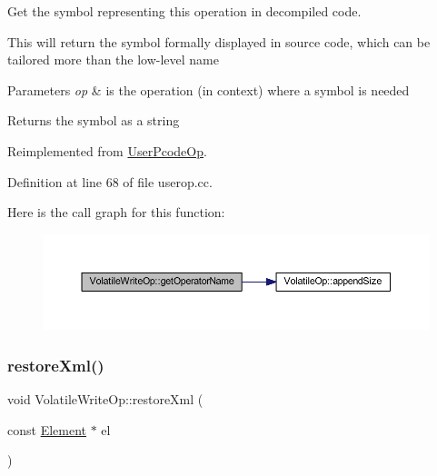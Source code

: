 Get the symbol representing this operation in decompiled code. 

This will return the symbol formally displayed in source code, which can be tailored more than the low-\/level name 
\begin{DoxyParams}{Parameters}
{\em op} & is the operation (in context) where a symbol is needed \\
\hline
\end{DoxyParams}
\begin{DoxyReturn}{Returns}
the symbol as a string 
\end{DoxyReturn}


Reimplemented from \mbox{\hyperlink{class_user_pcode_op_a7529472e93f9077d5bfdb9cc1142bfbb}{User\+Pcode\+Op}}.



Definition at line 68 of file userop.\+cc.

Here is the call graph for this function\+:
\nopagebreak
\begin{figure}[H]
\begin{center}
\leavevmode
\includegraphics[width=350pt]{class_volatile_write_op_aba63c56acfa184a248cfa78e1d346af5_cgraph}
\end{center}
\end{figure}
\mbox{\label{class_volatile_write_op_a7d0ae9b968d11ff809a46dec31e94d43}} 
\subsubsection{\texorpdfstring{restoreXml()}{restoreXml()}}
{\footnotesize\ttfamily void Volatile\+Write\+Op\+::restore\+Xml (\begin{DoxyParamCaption}\item[{const \mbox{\hyperlink{class_element}{Element}} $\ast$}]{el }\end{DoxyParamCaption})\hspace{0.3cm}{\ttfamily [virtual]}}



